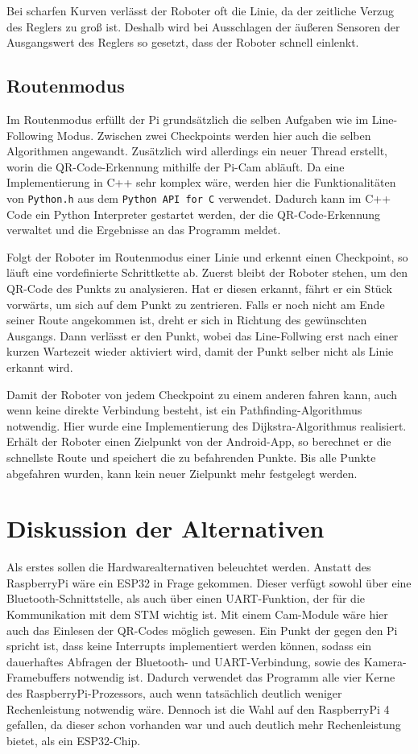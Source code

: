 \documentclass[12pt, a4paper]{report}
\begin{document}
Bei scharfen Kurven verlässt der Roboter oft die Linie, da der zeitliche Verzug des Reglers zu groß ist. Deshalb wird bei Ausschlagen der äußeren Sensoren der Ausgangswert des Reglers so gesetzt, dass der Roboter schnell einlenkt.


\subsection{Routenmodus}

Im Routenmodus erfüllt der Pi grundsätzlich die selben Aufgaben wie im Line-Following Modus. Zwischen zwei Checkpoints werden hier auch die selben Algorithmen angewandt. Zusätzlich wird allerdings ein neuer Thread erstellt, worin die QR-Code-Erkennung mithilfe der Pi-Cam abläuft. Da eine Implementierung in C++ sehr komplex wäre, werden hier die Funktionalitäten von \texttt{Python.h} aus dem \texttt{Python API for C} verwendet. Dadurch kann im C++ Code ein Python Interpreter gestartet werden, der die QR-Code-Erkennung verwaltet und die Ergebnisse an das Programm meldet.

Folgt der Roboter im Routenmodus einer Linie und erkennt einen Checkpoint, so läuft eine vordefinierte Schrittkette ab. Zuerst bleibt der Roboter stehen, um den QR-Code des Punkts zu analysieren. Hat er diesen erkannt, fährt er ein Stück vorwärts, um sich auf dem Punkt zu zentrieren. Falls er noch nicht am Ende seiner Route angekommen ist, dreht er sich in Richtung des gewünschten Ausgangs. Dann verlässt er den Punkt, wobei das Line-Follwing erst nach einer kurzen Wartezeit wieder aktiviert wird, damit der Punkt selber nicht als Linie erkannt wird.

Damit der Roboter von jedem Checkpoint zu einem anderen fahren kann, auch wenn keine direkte Verbindung besteht, ist ein Pathfinding-Algorithmus notwendig. Hier wurde eine Implementierung des Dijkstra-Algorithmus realisiert. Erhält der Roboter einen Zielpunkt von der Android-App, so berechnet er die schnellste Route und speichert die zu befahrenden Punkte. Bis alle Punkte abgefahren wurden, kann kein neuer Zielpunkt mehr festgelegt werden.


\newpage
\section{Diskussion der Alternativen}

Als erstes sollen die Hardwarealternativen beleuchtet werden. Anstatt des RaspberryPi wäre ein ESP32 in Frage gekommen. Dieser verfügt sowohl über eine Bluetooth-Schnittstelle, als auch über einen UART-Funktion, der für die Kommunikation mit dem STM wichtig ist. Mit einem Cam-Module wäre hier auch das Einlesen der QR-Codes möglich gewesen. Ein Punkt der gegen den Pi spricht ist, dass keine Interrupts implementiert werden können, sodass ein dauerhaftes Abfragen der Bluetooth- und UART-Verbindung, sowie des Kamera-Framebuffers notwendig ist. Dadurch verwendet das Programm alle vier Kerne des RaspberryPi-Prozessors, auch wenn tatsächlich deutlich weniger Rechenleistung notwendig wäre. Dennoch ist die Wahl auf den RaspberryPi 4 gefallen, da dieser schon vorhanden war und auch deutlich mehr Rechenleistung bietet, als ein ESP32-Chip.
\end{document}
